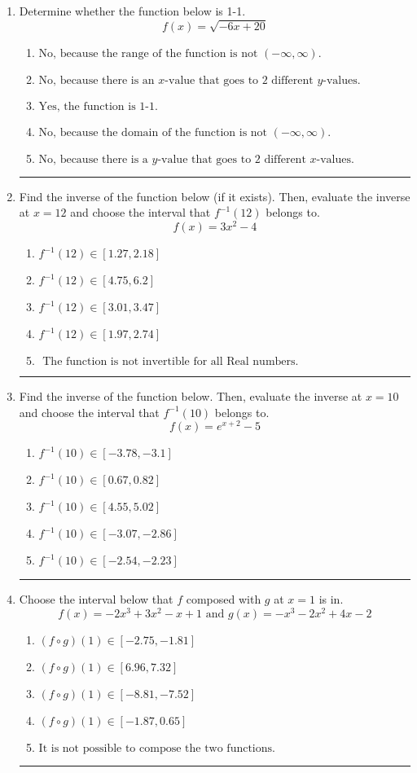 \documentclass[14pt]{extbook}
\newcommand{\litem}[1]{\item#1\hspace*{-1cm}\rule{\textwidth}{0.4pt}}
\begin{document}
\begin{enumerate}
{\begin{enumerate}[label=\Alph*.]
\end{enumerate} }
\litem{
Determine whether the function below is 1-1.\[ f(x) = \sqrt{-6 x + 20} \]\begin{enumerate}[label=\Alph*.]
\item \( \text{No, because the range of the function is not $(-\infty, \infty)$.} \)
\item \( \text{No, because there is an $x$-value that goes to 2 different $y$-values.} \)
\item \( \text{Yes, the function is 1-1.} \)
\item \( \text{No, because the domain of the function is not $(-\infty, \infty)$.} \)
\item \( \text{No, because there is a $y$-value that goes to 2 different $x$-values.} \)

\end{enumerate} }
\litem{
Find the inverse of the function below (if it exists). Then, evaluate the inverse at $x = 12$ and choose the interval that $f^{-1}(12)$ belongs to.\[ f(x) = 3 x^2 - 4 \]\begin{enumerate}[label=\Alph*.]
\item \( f^{-1}(12) \in [1.27, 2.18] \)
\item \( f^{-1}(12) \in [4.75, 6.2] \)
\item \( f^{-1}(12) \in [3.01, 3.47] \)
\item \( f^{-1}(12) \in [1.97, 2.74] \)
\item \( \text{ The function is not invertible for all Real numbers. } \)

\end{enumerate} }
\litem{
Find the inverse of the function below. Then, evaluate the inverse at $x = 10$ and choose the interval that $f^{-1}(10)$ belongs to.\[ f(x) = e^{x+2}-5 \]\begin{enumerate}[label=\Alph*.]
\item \( f^{-1}(10) \in [-3.78, -3.1] \)
\item \( f^{-1}(10) \in [0.67, 0.82] \)
\item \( f^{-1}(10) \in [4.55, 5.02] \)
\item \( f^{-1}(10) \in [-3.07, -2.86] \)
\item \( f^{-1}(10) \in [-2.54, -2.23] \)

\end{enumerate} }
\litem{
Choose the interval below that $f$ composed with $g$ at $x=1$ is in.\[ f(x) = -2x^{3} +3 x^{2} -x + 1 \text{ and } g(x) = -x^{3} -2 x^{2} +4 x -2 \]\begin{enumerate}[label=\Alph*.]
\item \( (f \circ g)(1) \in [-2.75, -1.81] \)
\item \( (f \circ g)(1) \in [6.96, 7.32] \)
\item \( (f \circ g)(1) \in [-8.81, -7.52] \)
\item \( (f \circ g)(1) \in [-1.87, 0.65] \)
\item \( \text{It is not possible to compose the two functions.} \)

\end{enumerate} }
\end{enumerate}
\end{document}
